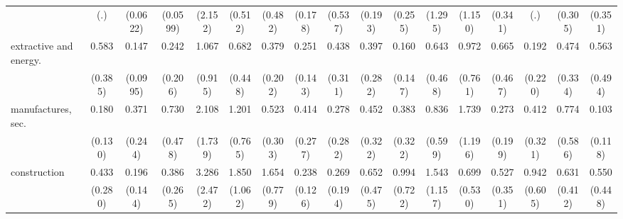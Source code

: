{\begin{tabular}{l*{16}{c}}
                    &         (.)         &    (0.0622)         &    (0.0599)         &     (2.152)         &     (0.512)         &     (0.482)         &     (0.178)         &     (0.537)         &     (0.193)         &     (0.255)         &     (1.295)         &     (1.150)         &     (0.341)         &         (.)         &     (0.305)         &     (0.351)         \\
[1em]
extractive and energy.&       0.583         &       0.147\sym{**} &       0.242         &       1.067         &       0.682         &       0.379         &       0.251\sym{*}  &       0.438         &       0.397         &       0.160\sym{*}  &       0.643         &       0.972         &       0.665         &       0.192         &       0.474         &       0.563         \\
                    &     (0.385)         &    (0.0995)         &     (0.206)         &     (0.915)         &     (0.448)         &     (0.202)         &     (0.143)         &     (0.311)         &     (0.282)         &     (0.147)         &     (0.468)         &     (0.761)         &     (0.467)         &     (0.220)         &     (0.334)         &     (0.494)         \\
[1em]
manufactures, sec.  &       0.180\sym{*}  &       0.371         &       0.730         &       2.108         &       1.201         &       0.523         &       0.414         &       0.278         &       0.452         &       0.383         &       0.836         &       1.739         &       0.273         &       0.412         &       0.774         &       0.103\sym{*}  \\
                    &     (0.130)         &     (0.244)         &     (0.478)         &     (1.739)         &     (0.765)         &     (0.303)         &     (0.277)         &     (0.282)         &     (0.322)         &     (0.322)         &     (0.599)         &     (1.196)         &     (0.199)         &     (0.321)         &     (0.586)         &     (0.118)         \\
[1em]
construction        &       0.433         &       0.196\sym{*}  &       0.386         &       3.286         &       1.850         &       1.654         &       0.238\sym{**} &       0.269         &       0.652         &       0.994         &       1.543         &       0.699         &       0.527         &       0.942         &       0.631         &       0.550         \\
                    &     (0.280)         &     (0.144)         &     (0.265)         &     (2.472)         &     (1.062)         &     (0.779)         &     (0.126)         &     (0.194)         &     (0.475)         &     (0.722)         &     (1.157)         &     (0.530)         &     (0.351)         &     (0.605)         &     (0.412)         &     (0.448)         \\

\end{tabular}}
